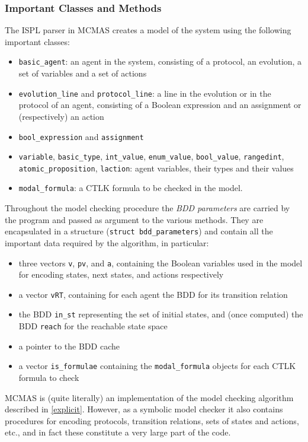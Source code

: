 \documentclass[11pt]{article}
\begin{document}
\subsubsection{Important Classes and Methods}
\label{MCMAS_steps}
The ISPL parser in MCMAS creates a model of the system using the following important classes: 
\begin{itemize}
\item \texttt{basic\_agent}: an agent in the system, consisting of a protocol, an evolution, a set of variables and a set of actions
\item \texttt{evolution\_line} and \texttt{protocol\_line}: a line in the evolution or in the protocol of an agent, consisting of a Boolean expression and an assignment or (respectively) an action
\item \texttt{bool\_expression} and \texttt{assignment}
\item \texttt{variable}, \texttt{basic\_type}, \texttt{int\_value}, \texttt{enum\_value}, \texttt{bool\_value},  \texttt{rangedint}, \texttt{atomic\_proposition}, \texttt{laction}: agent variables, their types and their values
\item \texttt{modal\_formula}: a CTLK formula to be checked in the model.
\end{itemize}
Throughout the model checking procedure the \textit{BDD parameters} are carried by the program and passed as argument to the various methods. They are encapsulated in a structure (\texttt{struct bdd\_parameters}) and contain all the important data required by the algorithm, in particular: 
\begin{itemize}
\item three vectors \texttt{v}, \texttt{pv}, and \texttt{a}, containing the Boolean variables used in the model for encoding states, next states, and actions respectively
\item a vector \texttt{vRT}, containing for each agent the BDD for its transition relation 
\item the BDD \texttt{in\_st} representing the set of initial states, and (once computed) the BDD \texttt{reach} for the reachable state space
\item a pointer to the BDD cache
\item a vector \texttt{is\_formulae} containing the \texttt{modal\_formula} objects for each CTLK formula to check
\end{itemize}
MCMAS is (quite literally) an implementation of the model checking algorithm described in \ref{explicit}. However, as a symbolic model checker it also contains procedures for encoding protocols, transition relations, sets of states and actions, etc., and in fact these constitute a very large part of the code. 
\end{document}
